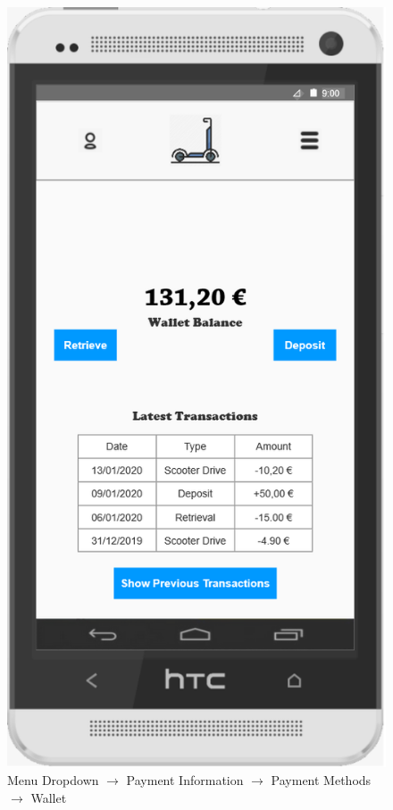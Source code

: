 \documentclass[a4paper, 12pt]{article}
\begin{document}
\begin{figure} [htbp]
  \begin{center}
    \includegraphics[scale=0.75]{images/prototypes/02-02-01-02-menu-dropdown--payment-information--payment-methods--wallet.png}
  \end{center}
  \caption{Menu Dropdown $\rightarrow$ Payment Information $\rightarrow$ Payment Methods $\rightarrow$ Wallet}
\end{figure}
\end{document}
